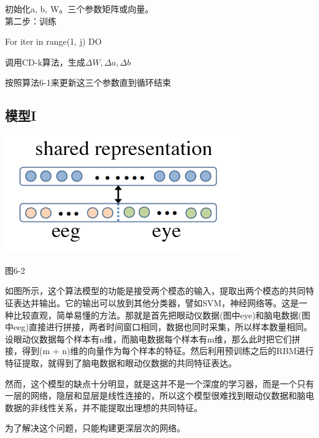 		\qquad 初始化a, b, W。三个参数矩阵或向量。\\
	第二步：训练
		
		\qquad For iter in range(1, j) DO
		
		\qquad \qquad 调用CD-k算法，生成$\Delta W, \Delta a, \Delta b$
		
		\qquad \qquad 按照算法6-1来更新这三个参数直到循环结束
		
	\subsection{模型I}
		\centerline{\includegraphics[width=4in]{figure/model1.png}} 
		\centerline{图6-2}
	
	如图所示，这个算法模型的功能是接受两个模态的输入，提取出两个模态的共同特征表达并输出。它的输出可以放到其他分类器，譬如SVM，神经网络等。这是一种比较直观，简单易懂的方法。那就是首先把眼动仪数据(图中eye)和脑电数据(图中eeg)直接进行拼接，两者时间窗口相同，数据也同时采集，所以样本数量相同。设眼动仪数据每个样本有n维，而脑电数据每个样本有m维，那么此时把它们拼接，得到(m + n)维的向量作为每个样本的特征。然后利用预训练之后的RBM进行特征提取，就得到了脑电数据和眼动仪数据的共同特征表达。
	
	然而，这个模型的缺点十分明显，就是这并不是一个深度的学习器，而是一个只有一层的网络，隐层和显层是线性连接的，所以这个模型很难找到眼动仪数据和脑电数据的非线性关系，并不能提取出理想的共同特征。
	
	为了解决这个问题，只能构建更深层次的网络。	
